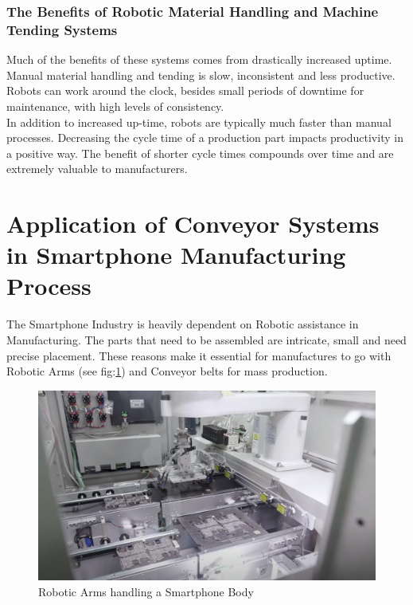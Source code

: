 \documentclass[11pt]{article}
\begin{document}
\subsubsection{The Benefits of Robotic Material Handling and Machine Tending Systems}
Much of the benefits of these systems comes from drastically increased uptime. Manual material handling and tending is slow, inconsistent and less productive. Robots can work around the clock, besides small periods of downtime for maintenance, with high levels of consistency. \\

In addition to increased up-time, robots are typically much faster than manual processes. Decreasing the cycle time of a production part impacts productivity in a positive way. The benefit of shorter cycle times compounds over time and are extremely valuable to manufacturers.


\section{Application of Conveyor Systems in Smartphone Manufacturing Process}

The Smartphone Industry is heavily dependent on Robotic assistance in Manufacturing. The parts that need to be assembled are intricate, small and need precise placement. These reasons make it essential for manufactures to go with Robotic Arms (see fig:\ref{fig:Robotic Arms}) and Conveyor belts for mass production. 


\begin{figure}[H]
	\centering
	\includegraphics[scale=0.3]{Robotic Arms.jpg}
	\caption{Robotic Arms handling a Smartphone Body\cite{How Smartphones Are Made in Factory}}
	\label{fig:Robotic Arms}
\end{figure}
\end{document}
